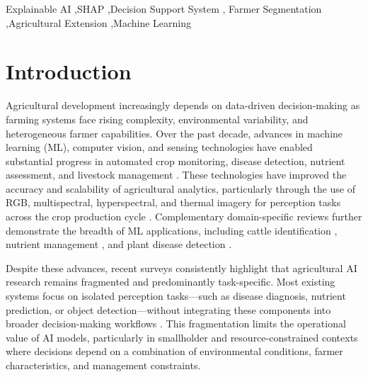\documentclass[3p,twocolumn,authoryear]{elsarticle}
\begin{document}
\begin{frontmatter}
\begin{abstract}
Cross-validated classification accuracy ($91.7 \pm 3.6$\%) and
surrogate fidelity (93.3\%) confirm the robustness and structural
consistency of the extracted rules.
Prospective validation is recommended prior to operational deployment.

The proposed SAR architecture provides a deployable and auditable
framework for AI-driven human capital development in agricultural
extension systems, with applicability subject to population-specific
recalibration.

\end{abstract}

\begin{keyword}
Explainable AI \sep SHAP \sep Decision Support System \sep
Farmer Segmentation \sep Agricultural Extension \sep Machine Learning
\end{keyword}

\end{frontmatter}


\section{Introduction}

Agricultural development increasingly depends on data-driven
decision-making as farming systems face rising complexity, environmental
variability, and heterogeneous farmer capabilities.
Over the past decade, advances in machine learning (ML), computer vision,
and sensing technologies have enabled substantial progress in automated
crop monitoring, disease detection, nutrient assessment, and livestock
management \citep{kamilaris2018,liakos2018,ghazal2024survey,yang2025}.
These technologies have improved the accuracy and scalability of
agricultural analytics, particularly through the use of RGB,
multispectral, hyperspectral, and thermal imagery for perception tasks
across the crop production cycle \citep{ghazal2024survey}.
Complementary domain-specific reviews further demonstrate the breadth
of ML applications, including cattle identification
\citep{hossain2022cattle}, nutrient management \citep{ennaji2023nutrient},
and plant disease detection \citep{omaye2024disease}.

Despite these advances, recent surveys consistently highlight that
agricultural AI research remains fragmented and predominantly
task-specific.
Most existing systems focus on isolated perception tasks---such as disease
diagnosis, nutrient prediction, or object detection---without integrating
these components into broader decision-making workflows
\citep{ghazal2024survey,omaye2024disease}.
This fragmentation limits the operational value of AI models,
particularly in smallholder and resource-constrained contexts where
decisions depend on a combination of environmental conditions, farmer
characteristics, and management constraints.
\end{document}
